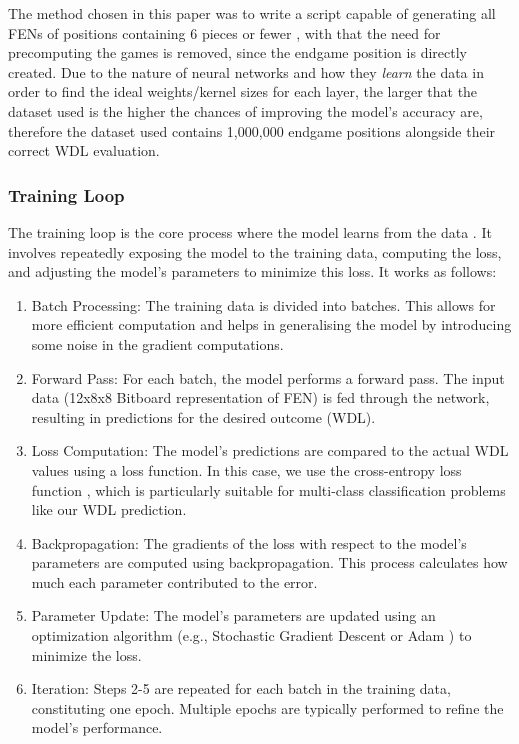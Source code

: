 The method chosen in this paper was to write a script capable of generating all FENs of positions containing 6 pieces or fewer \cite{FEN}, with that the need for precomputing the games is removed, since the endgame position is directly created. Due to the nature of neural networks and how they \textit{learn} the data in order to find the ideal weights/kernel sizes for each layer, the larger that the dataset used is the higher the chances of improving the model's accuracy are, therefore the dataset used contains 1,000,000 endgame positions alongside their correct WDL evaluation.

\subsubsection{Training Loop}
The training loop is the core process where the model learns from the data \cite{TrainingPyTorch}. It involves repeatedly exposing the model to the training data, computing the loss, and adjusting the model's parameters to minimize this loss. It works as follows:

\begin{enumerate}
    \item Batch Processing: The training data is divided into batches. This allows for more efficient computation and helps in generalising the model by introducing some noise in the gradient computations.
    \item Forward Pass: For each batch, the model performs a forward pass. The input data (12x8x8 Bitboard representation of FEN) is fed through the network, resulting in predictions for the desired outcome (WDL).
    \item Loss Computation: The model's predictions are compared to the actual WDL values using a loss function. In this case, we use the cross-entropy loss function \cite{mao2023crossentropylossfunctionstheoretical}, which is particularly suitable for multi-class classification problems like our WDL prediction.
    \item Backpropagation: The gradients of the loss with respect to the model's parameters are computed using backpropagation. This process calculates how much each parameter contributed to the error.
    \item Parameter Update: The model's parameters are updated using an optimization algorithm (e.g., Stochastic Gradient Descent or Adam \cite{Goodfellow-et-al-2016}) to minimize the loss.
    \item Iteration: Steps 2-5 are repeated for each batch in the training data, constituting one epoch. Multiple epochs are typically performed to refine the model's performance.
    
\end{enumerate}

